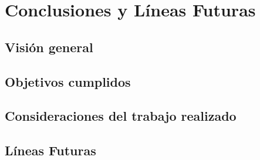 \chapter{Conclusiones y Líneas Futuras}

\section{Visión general}

\section{Objetivos cumplidos}

\section{Consideraciones del trabajo realizado}

\section{Líneas Futuras}